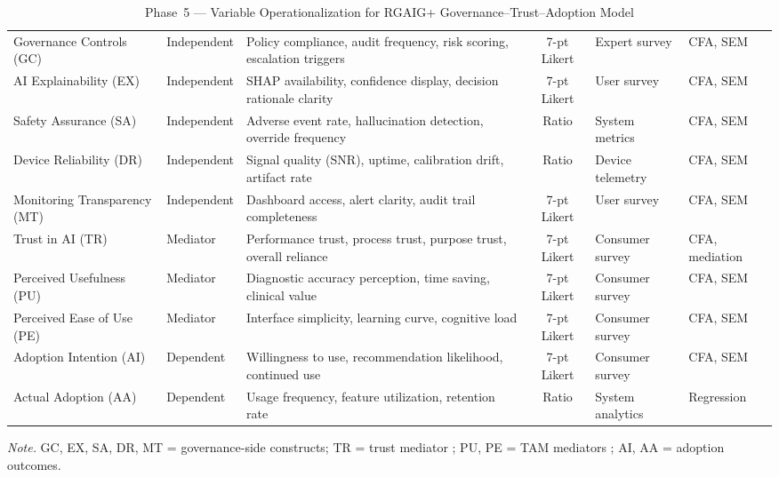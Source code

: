 \begin{xltabular}{\textwidth}{@{} p{0.14\textwidth} l X c p{0.10\textwidth} p{0.09\textwidth} @{}}
\caption[Phase~5 --- Variable Operationalization for RGAIG+]{Phase~5 --- Variable Operationalization for RGAIG+ Governance--Trust--Adoption Model}
\label{tab:rgaig_variable_operationalization}\\
\toprule
{} &  &  &  &  &  \\
\midrule
\endfirsthead
\endhead
\bottomrule
\endlastfoot
Governance Controls (GC) & Independent & Policy compliance, audit frequency, risk scoring, escalation triggers & 7-pt Likert & Expert survey & CFA, SEM \\
\addlinespace
AI Explainability (EX) & Independent & SHAP availability, confidence display, decision rationale clarity & 7-pt Likert & User survey & CFA, SEM \\
\addlinespace
Safety Assurance (SA) & Independent & Adverse event rate, hallucination detection, override frequency & Ratio & System metrics & CFA, SEM \\
\addlinespace
Device Reliability (DR) & Independent & Signal quality (SNR), uptime, calibration drift, artifact rate & Ratio & Device telemetry & CFA, SEM \\
\addlinespace
Monitoring Transparency (MT) & Independent & Dashboard access, alert clarity, audit trail completeness & 7-pt Likert & User survey & CFA, SEM \\
\addlinespace
Trust in AI (TR) & Mediator & Performance trust, process trust, purpose trust, overall reliance & 7-pt Likert & Consumer survey & CFA, mediation \\
\addlinespace
Perceived Usefulness (PU) & Mediator & Diagnostic accuracy perception, time saving, clinical value & 7-pt Likert & Consumer survey & CFA, SEM \\
\addlinespace
Perceived Ease of Use (PE) & Mediator & Interface simplicity, learning curve, cognitive load & 7-pt Likert & Consumer survey & CFA, SEM \\
\addlinespace
Adoption Intention (AI) & Dependent & Willingness to use, recommendation likelihood, continued use & 7-pt Likert & Consumer survey & CFA, SEM \\
\addlinespace
Actual Adoption (AA) & Dependent & Usage frequency, feature utilization, retention rate & Ratio & System analytics & Regression \\
\end{xltabular}
\par\smallskip\noindent\textit{Note.} GC, EX, SA, DR, MT = governance-side constructs; TR = trust mediator \citep{lee2004trust}; PU, PE = TAM mediators \citep{davis1989tam}; AI, AA = adoption outcomes.
\endgroup

